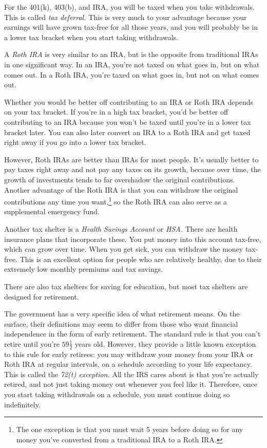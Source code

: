 For the 401(k), 403(b), and IRA, you will be taxed when you take withdrawals. This is called \emph{tax deferral.} This is very much to your advantage because your earnings will have grown tax-free for all those years, and you will probably be in a lower tax bracket when you start taking withdrawals.

A \emph{Roth IRA} is very similar to an IRA, but is the opposite from traditional IRAs in one significant way. In an IRA, you're not taxed on what goes in, but on what comes out. In a Roth IRA, you're taxed on what goes in, but not on what comes out.

Whether you would be better off contributing to an IRA or Roth IRA depends on your tax bracket. If you're in a high tax bracket, you'd be better off contributing to an IRA because you won't be taxed until you're in a lower tax bracket later. You can also later convert an IRA to a Roth IRA and get taxed right away if you go into a lower tax bracket.

However, Roth IRAs are better than IRAs for most people. It's usually better to pay taxes right away and not pay any taxes on its growth, because over time, the growth of investments tends to far overshadow the original contributions. Another advantage of the Roth IRA is that you can withdraw the original contributions any time you want,\footnote{The one exception is that you must wait 5 years before doing so for any money you've converted from a traditional IRA to a Roth IRA.} so the Roth IRA can also serve as a supplemental emergency fund.

Another tax shelter is a \emph{Health Savings Account} or \emph{HSA.} There are health insurance plans that incorporate these. You put money into this account tax-free, which can grow over time. When you get sick, you can withdraw the money tax-free. This is an excellent option for people who are relatively healthy, due to their extremely low monthly premiums and tax savings.

There are also tax shelters for saving for education, but most tax shelters are designed for retirement.

The government has a very specific idea of what retirement means. On the surface, their definitions may seem to differ from those who want financial independence in the form of early retirement. The standard rule is that you can't retire until you're $59 \frac{1}{2}$ years old. However, they provide a little known exception to this rule for early retirees: you may withdraw your money from your IRA or Roth IRA at regular intervals, on a schedule according to your life expectancy. This is called the \emph{72(t) exception.} All the IRS cares about is that you're actually retired, and not just taking money out whenever you feel like it. Therefore, once you start taking withdrawals on a schedule, you must continue doing so indefinitely.

